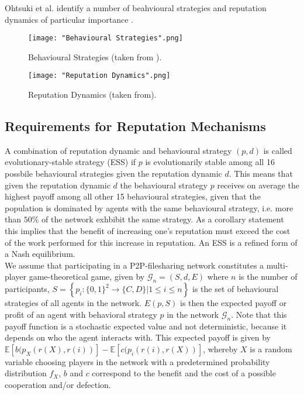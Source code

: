 \noindent{}Ohtsuki et al. identify a number of beahvioural strategies and reputation dynamics of particular importance \cite{How Should we Define Goodness}.

{\centering
\begin{figure}[H]
\begin{center}
\texttt{[image: "Behavioural Strategies".png]}
\end{center}
\label{fig:BehvaiouralStrategies}
\caption{Behavioural Strategies (taken from \cite{The leading eight: Social norms that can maintain cooperation by indirect reciprocity}).}
\end{figure}
}

{\centering
\begin{figure}[H]
\texttt{[image: "Reputation Dynamics".png]}
\label{fig:ReputationDynamics}
\caption{Reputation Dynamics (taken from\cite{The leading eight: Social norms that can maintain cooperation by indirect reciprocity}).}
\end{figure}
}

\subsection{Requirements for Reputation Mechanisms}
\label{subsec:Requirements for Reputation Mechanisms}

\noindent{}A combination of reputation dynamic and behavioural strategy $(p,d)$ is called evolutionary-stable strategy (ESS) if $p$ is evolutionarily stable among all 16 possbile behavioural strategies given the reputation dynamic $d$. This means that given the reputation dynamic $d$ the behavioural strategy $p$ receives on average the highest payoff among all other 15 behavioural strategies, given that the population is dominated by agents with the same behavioural strategy, i.e. more than $50\%$ of the network exhbibit the same strategy. As a corollary statement this implies that the benefit of increasing one's reputation must exceed the cost of the work performed for this increase in reputation. An ESS is a refined form of a Nash equilibrium.\vspace{1em}\\

\noindent{}We assume that participating in a P2P-filesharing network constitutes a multi-player game-theoretical game, given by $\mathcal{G}_n=(S,d,E)$ where $n$ is the number of participants, $S=\left\lbrace{}p_i:\{0,1\}^2\rightarrow{}\{C,D\}|1\leq{}i\leq{}n\right\rbrace$ is the set of behavioural strategies of all agents in the network. $E(p,S)$ is then the expected payoff or profit of an agent with behavioral strategy $p$ in the network $\mathcal{G}_n$. Note that this payoff function is a stochastic expected value and not deterministic, because it depends on who the agent interacts with. This expected payoff is given by $\mathbb{E}[b(p_X(r(X),r(i))]-\mathbb{E}[c(p_i(r(i),r(X))]$, whereby $X$ is a random variable choosing players in the network with a predetermined probability distribution $f_X$, $b$ and $c$ correspond to the benefit and the cost of a possible cooperation and/or defection. \vspace{1em}\\

